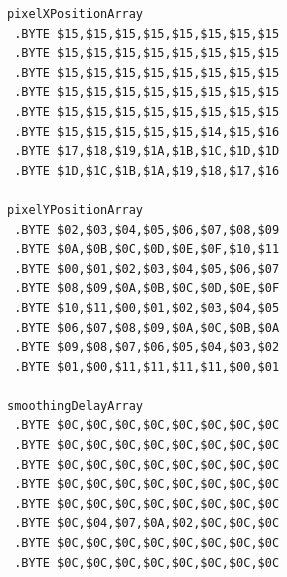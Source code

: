 \begin{minipage}[b]{0.33\linewidth}
\begin{lrbox}{\mybox}
\begin{lstlisting}[basicstyle=\ttfamily\tiny]
pixelXPositionArray   
 .BYTE $15,$15,$15,$15,$15,$15,$15,$15
 .BYTE $15,$15,$15,$15,$15,$15,$15,$15
 .BYTE $15,$15,$15,$15,$15,$15,$15,$15
 .BYTE $15,$15,$15,$15,$15,$15,$15,$15
 .BYTE $15,$15,$15,$15,$15,$15,$15,$15
 .BYTE $15,$15,$15,$15,$15,$14,$15,$16
 .BYTE $17,$18,$19,$1A,$1B,$1C,$1D,$1D
 .BYTE $1D,$1C,$1B,$1A,$19,$18,$17,$16

pixelYPositionArray   
 .BYTE $02,$03,$04,$05,$06,$07,$08,$09
 .BYTE $0A,$0B,$0C,$0D,$0E,$0F,$10,$11
 .BYTE $00,$01,$02,$03,$04,$05,$06,$07
 .BYTE $08,$09,$0A,$0B,$0C,$0D,$0E,$0F
 .BYTE $10,$11,$00,$01,$02,$03,$04,$05
 .BYTE $06,$07,$08,$09,$0A,$0C,$0B,$0A
 .BYTE $09,$08,$07,$06,$05,$04,$03,$02
 .BYTE $01,$00,$11,$11,$11,$11,$00,$01

smoothingDelayArray   
 .BYTE $0C,$0C,$0C,$0C,$0C,$0C,$0C,$0C
 .BYTE $0C,$0C,$0C,$0C,$0C,$0C,$0C,$0C
 .BYTE $0C,$0C,$0C,$0C,$0C,$0C,$0C,$0C
 .BYTE $0C,$0C,$0C,$0C,$0C,$0C,$0C,$0C
 .BYTE $0C,$0C,$0C,$0C,$0C,$0C,$0C,$0C
 .BYTE $0C,$04,$07,$0A,$02,$0C,$0C,$0C
 .BYTE $0C,$0C,$0C,$0C,$0C,$0C,$0C,$0C
 .BYTE $0C,$0C,$0C,$0C,$0C,$0C,$0C,$0C
\end{lstlisting}
\end{lrbox}%
\scalebox{0.8}{\usebox{\mybox}}
\end{minipage}
\hspace{0.5cm}
